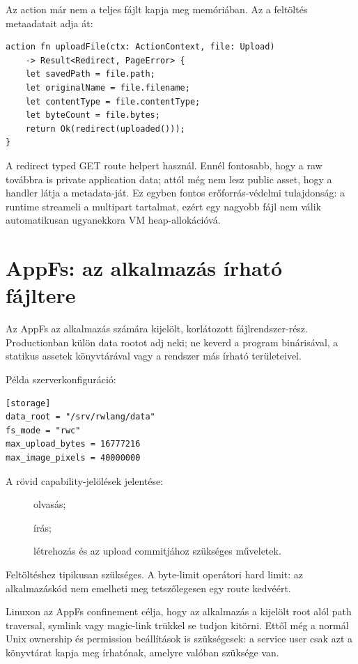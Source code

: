 \newpage
Az action már nem a teljes fájlt kapja meg memóriában. Az  a feltöltés metaadatait adja át:

\begin{lstlisting}[language=RWLang]
action fn uploadFile(ctx: ActionContext, file: Upload)
    -> Result<Redirect, PageError> {
    let savedPath = file.path;
    let originalName = file.filename;
    let contentType = file.contentType;
    let byteCount = file.bytes;
    return Ok(redirect(uploaded()));
}
\end{lstlisting}

A redirect typed  GET route helpert használ. Ennél fontosabb, hogy a raw  továbbra is private application data; attól még nem lesz public asset, hogy a handler látja a metadata-ját. Ez egyben fontos erőforrás-védelmi tulajdonság: a runtime streameli a multipart tartalmat, ezért egy nagyobb fájl nem válik automatikusan ugyanekkora VM heap-allokációvá.

\section{AppFs: az alkalmazás írható fájltere}

Az AppFs az alkalmazás számára kijelölt, korlátozott fájlrendszer-rész. Productionban külön data rootot adj neki; ne keverd a program binárisával, a statikus assetek könyvtárával vagy a rendszer más írható területeivel.

Példa szerverkonfiguráció:

\begin{lstlisting}
[storage]
data_root = "/srv/rwlang/data"
fs_mode = "rwc"
max_upload_bytes = 16777216
max_image_pixels = 40000000
\end{lstlisting}

A rövid capability-jelölések jelentése:

\begin{description}
  \item[] olvasás;
  \item[] írás;
  \item[] létrehozás és az upload commitjához szükséges műveletek.
\end{description}

Feltöltéshez tipikusan  szükséges. A byte-limit operátori hard limit: az alkalmazáskód nem emelheti meg tetszőlegesen egy route kedvéért.

Linuxon az AppFs confinement célja, hogy az alkalmazás a kijelölt root alól path traversal, symlink vagy magic-link trükkel se tudjon kitörni. Ettől még a normál Unix ownership és permission beállítások is szükségesek: a service user csak azt a könyvtárat kapja meg írhatónak, amelyre valóban szüksége van.

